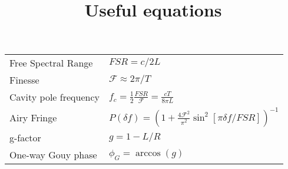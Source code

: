 \documentclass{article}
\begin{document}
\title{Useful equations}
\maketitle

\Large
\begin{tabular}{p{2in}p{4in}}
  Free Spectral Range & $FSR = c/2 L$\\
  Finesse & $ \mathcal{F} \approx 2 \pi/ T$ \\
  Cavity pole frequency & $f_c = \frac{1}{2}\frac{FSR}{\mathcal{F}}=\frac{cT}{8\pi L}$\\
  Airy Fringe & $P(\delta f) = \left (1 + \frac{4 \mathcal{F}^2}{\pi^2} \sin^2 [
  \pi \delta f / FSR ] \right)^{-1} $ \\
  g-factor & $g = 1 - L/R$ \\
  One-way Gouy phase & $\phi_G = \arccos(g)$ 

\end{tabular}
\end{document}

